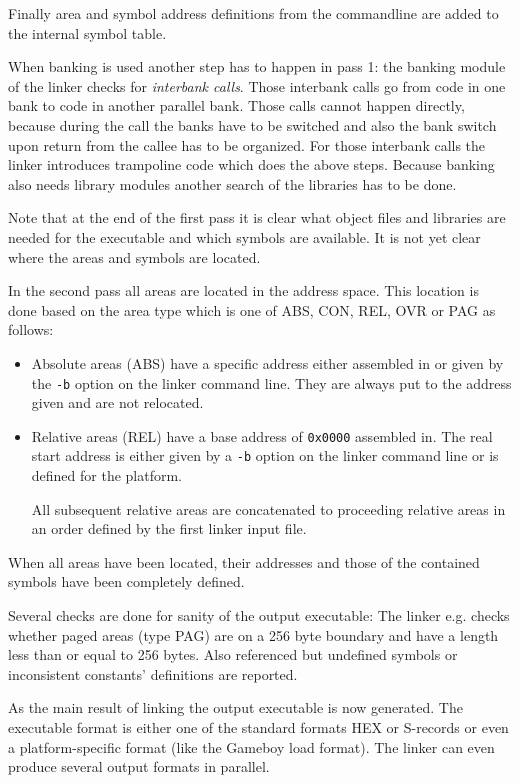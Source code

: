 \documentclass[10pt]{article}
\newcommand{\code}[1]{{\lstset{basicstyle=\normalsize\ttfamily}\lstinline!#1!}}
\begin{document}
Finally area and symbol address definitions from the commandline are
added to the internal symbol table.

When banking is used another step has to happen in pass 1: the banking
module of the linker checks for \emph{interbank calls}.  Those
interbank calls go from code in one bank to code in another parallel
bank.  Those calls cannot happen directly, because during the call the
banks have to be switched and also the bank switch upon return from
the callee has to be organized.  For those interbank calls the linker
introduces trampoline code which does the above steps.  Because
banking also needs library modules another search of the libraries has
to be done.

Note that at the end of the first pass it is clear what object files
and libraries are needed for the executable and which symbols are
available.  It is not yet clear where the areas and symbols are
located.

In the second pass all areas are located in the address space.  This
location is done based on the area type which is one of ABS, CON, REL,
OVR or PAG as follows:

\begin{itemize}
  \item Absolute areas (ABS) have a specific address either assembled
        in or given by the \code{-b} option on the linker command
        line.  They are always put to the address given and are not
        relocated.

  \item Relative areas (REL) have a base address of \code{0x0000}
        assembled in.  The real start address is either given by a
        \code{-b} option on the linker command line or is defined for
        the platform.

        All subsequent relative areas are concatenated to proceeding
        relative areas in an order defined by the first linker input
        file.
\end{itemize}

When all areas have been located, their addresses and those of the
contained symbols have been completely defined.

Several checks are done for sanity of the output executable: The
linker e.g. checks whether paged areas (type PAG) are on a 256 byte
boundary and have a length less than or equal to 256 bytes.  Also
referenced but undefined symbols or inconsistent constants'
definitions are reported.

As the main result of linking the output executable is now generated.
The executable format is either one of the standard formats HEX or
S-records or even a platform-specific format (like the Gameboy load
format).  The linker can even produce several output formats in
parallel.
\end{document}

